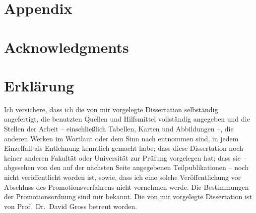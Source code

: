 \documentclass[
  a4paper,
  11pt,
  BCOR=8mm,
  twoside,
  headsepline]{scrbook}
\begin{document}
\tableofcontents
\newpage
\makeatletter
\providecommand\@dotsep{5}
\makeatother
\listoftodos\relax
\newpage

\mainmatter







\appendix

\begingroup
\chapter{Appendix}%

\let\clearpage\relax



\endgroup

\printbibliography[heading=bibintoc]


\chapter*{Acknowledgments}

\chapter*{Erklärung}

Ich versichere, dass ich die von mir vorgelegte Dissertation selbständig angefertigt, die benutzten Quellen und Hilfsmittel vollständig angegeben und die Stellen der Arbeit -- einschließlich Tabellen, Karten und Abbildungen --, die anderen Werken im Wortlaut oder dem Sinn nach entnommen sind, in jedem Einzelfall als Entlehnung kenntlich gemacht habe; dass diese Dissertation noch keiner anderen Fakultät oder Universität zur Prüfung vorgelegen hat; dass sie -- abgesehen von den auf der nächsten Seite angegebenen Teilpublikationen -- noch nicht veröffentlicht worden ist, sowie, dass ich eine solche Veröffentlichung vor Abschluss des Promotionsverfahrens nicht vornehmen werde.
Die Bestimmungen der Promotionsordnung sind mir bekannt.
Die von mir vorgelegte Dissertation ist von Prof.\ Dr.\ David Gross betreut worden.
\end{document}
